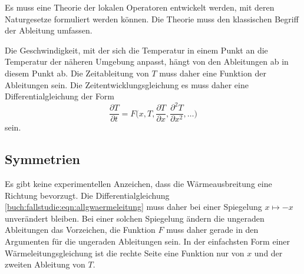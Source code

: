 \begin{aufgabe}
Es muss eine Theorie der lokalen Operatoren entwickelt werden, mit deren
Naturgesetze formuliert werden können.
Die Theorie muss den klassischen Begriff der Ableitung umfassen.
\end{aufgabe}

Die Geschwindigkeit, mit der sich die Temperatur in einem Punkt
an die Temperatur der näheren Umgebung anpasst, hängt von den
Ableitungen ab in diesem Punkt ab.
Die Zeitableitung von $T$ muss daher eine Funktion der Ableitungen
sein.
Die Zeitentwicklungsgleichung es muss daher eine Differentialgleichung
der Form
\begin{equation}
\frac{\partial T}{\partial t}
=
F\biggl(x,
T,
\frac{\partial T}{\partial x},
\frac{\partial^2 T}{\partial x^2},
\dots
\biggr)
\label{buch:fallstudie:eqn:allgwaermeleitung}
\end{equation}
sein.

\subsection{Symmetrien}
Es gibt keine experimentellen Anzeichen, dass die Wärmeausbreitung
eine Richtung bevorzugt.
Die Differentialgleichung
\eqref{buch:fallstudie:eqn:allgwaermeleitung}
muss daher bei einer Spiegelung $x\mapsto -x$ unverändert bleiben.
Bei einer solchen Spiegelung ändern die ungeraden Ableitungen
das Vorzeichen, die Funktion $F$ muss daher gerade in den Argumenten
für die ungeraden Ableitungen sein.
In der einfachsten Form einer Wärmeleitungsgleichung ist die rechte
Seite eine Funktion nur von $x$ und der zweiten Ableitung von $T$.

